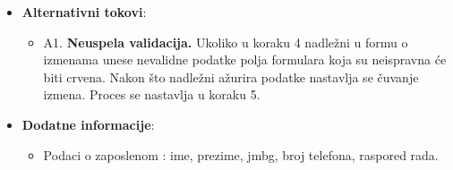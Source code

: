 \begin{itemize}
  \item \textbf{Alternativni tokovi}:
      \begin{itemize}
        \item A1. \textbf{Neuspela validacija.}
        Ukoliko u koraku 4 nadležni u formu o izmenama unese nevalidne podatke polja formulara koja su neispravna će biti crvena.
        Nakon što nadležni ažurira podatke nastavlja se čuvanje izmena. Proces se nastavlja u koraku 5.
      \end{itemize}

      
  \item \textbf{Dodatne informacije}:
      \begin{itemize}
        \item Podaci o zaposlenom : ime, prezime, jmbg, broj telefona, raspored rada.
      \end{itemize}
\end{itemize}
